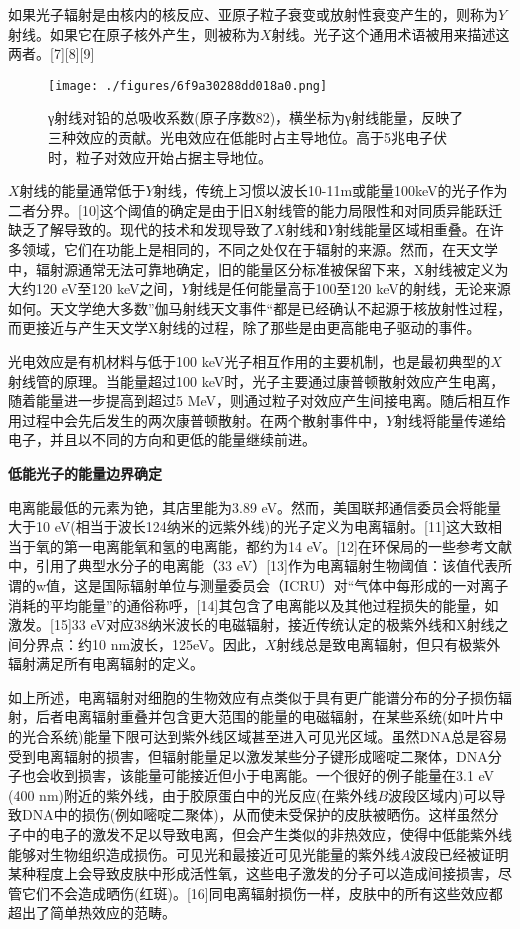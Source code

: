 如果光子辐射是由核内的核反应、亚原子粒子衰变或放射性衰变产生的，则称为$Y$射线。如果它在原子核外产生，则被称为$X$射线。光子这个通用术语被用来描述这两者。[7][8][9]
\begin{figure}[ht]
\centering
\texttt{[image: ./figures/6f9a30288dd018a0.png]}
\caption{γ射线对铅的总吸收系数(原子序数82)，横坐标为γ射线能量，反映了三种效应的贡献。光电效应在低能时占主导地位。高于5兆电子伏时，粒子对效应开始占据主导地位。} \label{fig_DLFS_4}
\end{figure}
$X$射线的能量通常低于$Y$射线，传统上习惯以波长10-11m或能量100keV的光子作为二者分界。[10]这个阈值的确定是由于旧X射线管的能力局限性和对同质异能跃迁缺乏了解导致的。现代的技术和发现导致了$X$射线和$Y$射线能量区域相重叠。在许多领域，它们在功能上是相同的，不同之处仅在于辐射的来源。然而，在天文学中，辐射源通常无法可靠地确定，旧的能量区分标准被保留下来，X射线被定义为大约120 eV至120 keV之间，$Y$射线是任何能量高于100至120 keV的射线，无论来源如何。天文学绝大多数”伽马射线天文事件“都是已经确认不起源于核放射性过程，而更接近与产生天文学X射线的过程，除了那些是由更高能电子驱动的事件。

光电效应是有机材料与低于100 keV光子相互作用的主要机制，也是最初典型的$X$射线管的原理。当能量超过100 keV时，光子主要通过康普顿散射效应产生电离，随着能量进一步提高到超过5 MeV，则通过粒子对效应产生间接电离。随后相互作用过程中会先后发生的两次康普顿散射。在两个散射事件中，$Y$射线将能量传递给电子，并且以不同的方向和更低的能量继续前进。

\textbf{低能光子的能量边界确定}

电离能最低的元素为铯，其店里能为3.89 eV。然而，美国联邦通信委员会将能量大于10 eV(相当于波长124纳米的远紫外线)的光子定义为电离辐射。[11]这大致相当于氧的第一电离能氧和氢的电离能，都约为14 eV。[12]在环保局的一些参考文献中，引用了典型水分子的电离能（33 eV）[13]作为电离辐射生物阈值：该值代表所谓的w值，这是国际辐射单位与测量委员会（ICRU）对“气体中每形成的一对离子消耗的平均能量”的通俗称呼，[14]其包含了电离能以及其他过程损失的能量，如激发。[15]33 eV对应38纳米波长的电磁辐射，接近传统认定的极紫外线和X射线之间分界点：约10 nm波长，125eV。因此，$X$射线总是致电离辐射，但只有极紫外辐射满足所有电离辐射的定义。

如上所述，电离辐射对细胞的生物效应有点类似于具有更广能谱分布的分子损伤辐射，后者电离辐射重叠并包含更大范围的能量的电磁辐射，在某些系统(如叶片中的光合系统)能量下限可达到紫外线区域甚至进入可见光区域。虽然DNA总是容易受到电离辐射的损害，但辐射能量足以激发某些分子键形成嘧啶二聚体，DNA分子也会收到损害，该能量可能接近但小于电离能。一个很好的例子能量在3.1 eV (400 nm)附近的紫外线，由于胶原蛋白中的光反应(在紫外线$B$波段区域内)可以导致DNA中的损伤(例如嘧啶二聚体)，从而使未受保护的皮肤被晒伤。这样虽然分子中的电子的激发不足以导致电离，但会产生类似的非热效应，使得中低能紫外线能够对生物组织造成损伤。可见光和最接近可见光能量的紫外线$A$波段已经被证明某种程度上会导致皮肤中形成活性氧，这些电子激发的分子可以造成间接损害，尽管它们不会造成晒伤(红斑)。[16]同电离辐射损伤一样，皮肤中的所有这些效应都超出了简单热效应的范畴。

